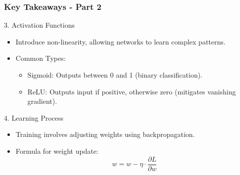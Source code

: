 \documentclass[aspectratio=169]{beamer}
\begin{document}
\begin{frame}[fragile]
    \frametitle{Key Takeaways - Part 2}
    \begin{block}{3. Activation Functions}
        \begin{itemize}
            \item Introduce non-linearity, allowing networks to learn complex patterns.
            \item Common Types:
            \begin{itemize}
                \item Sigmoid: Outputs between 0 and 1 (binary classification).
                \item ReLU: Outputs input if positive, otherwise zero (mitigates vanishing gradient).
            \end{itemize}
        \end{itemize}
    \end{block}
    
    \begin{block}{4. Learning Process}
        \begin{itemize}
            \item Training involves adjusting weights using backpropagation.
            \item Formula for weight update:
            \begin{equation}
                w = w - \eta \cdot \frac{\partial L}{\partial w}
            \end{equation}
        \end{itemize}
    \end{block}
\end{frame}
\end{document}

